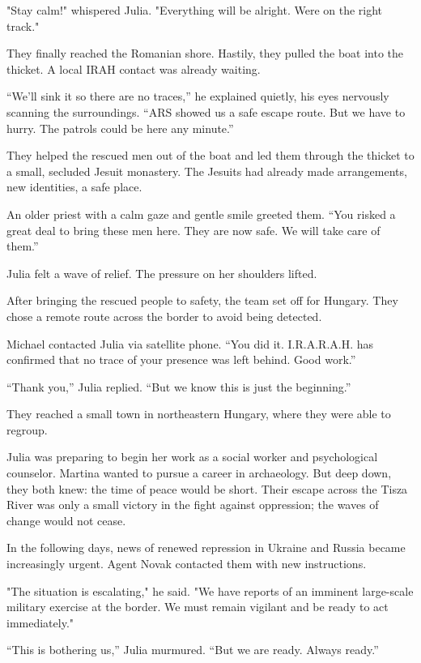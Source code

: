 \documentclass[
]{article}
\begin{document}
"Stay calm!" whispered Julia. "Everything will be alright. We\textquotesingle re on the right track."

They finally reached the Romanian shore. Hastily, they pulled the boat into the thicket. A local IRAH contact was already waiting.

``We'll sink it so there are no traces,'' he explained quietly, his eyes nervously scanning the surroundings. ``ARS showed us a safe escape route. But we have to hurry. The patrols could be here any minute.''

They helped the rescued men out of the boat and led them through the thicket to a small, secluded Jesuit monastery. The Jesuits had already made arrangements, new identities, a safe place.

An older priest with a calm gaze and gentle smile greeted them. ``You risked a great deal to bring these men here. They are now safe. We will take care of them.''

Julia felt a wave of relief. The pressure on her shoulders lifted.

After bringing the rescued people to safety, the team set off for Hungary. They chose a remote route across the border to avoid being detected.

Michael contacted Julia via satellite phone. ``You did it. I.R.A.R.A.H. has confirmed that no trace of your presence was left behind. Good work.''

``Thank you,'' Julia replied. ``But we know this is just the beginning.''

They reached a small town in northeastern Hungary, where they were able to regroup.

Julia was preparing to begin her work as a social worker and psychological counselor. Martina wanted to pursue a career in archaeology. But deep down, they both knew: the time of peace would be short. Their escape across the Tisza River was only a small victory in the fight against oppression; the waves of change would not cease.

In the following days, news of renewed repression in Ukraine and Russia became increasingly urgent. Agent Novak contacted them with new instructions.

"The situation is escalating," he said. "We have reports of an imminent large-scale military exercise at the border. We must remain vigilant and be ready to act immediately."

``This is bothering us,'' Julia murmured. ``But we are ready. Always ready.''
\end{document}
